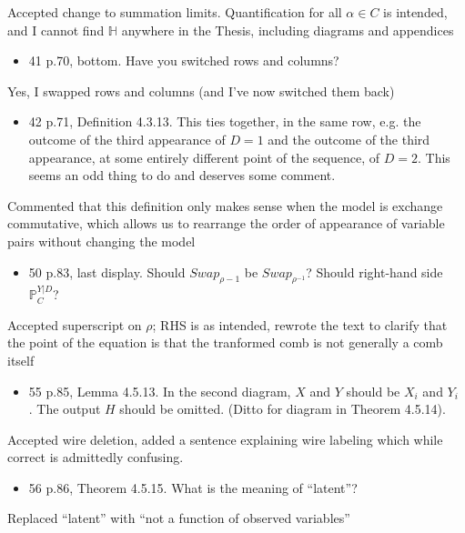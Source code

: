 \documentclass[12pt, a4paper]{article}
\begin{document}
Accepted change to summation limits. Quantification for all $\alpha \in C$ is intended, and I cannot find $\mathbb{H}$ anywhere in the Thesis, including diagrams and appendices

\begin{itemize}
    \item 41 p.70, bottom. Have you switched rows and columns?
\end{itemize}
 

Yes, I swapped rows and columns (and I've now switched them back)

\begin{itemize}
    \item 42 p.71, Definition 4.3.13. This ties together, in the same row, e.g. the outcome of the third appearance of $D = 1$ and the outcome of the third appearance, at some entirely different point of the sequence, of $D = 2$. This seems an odd thing to do and deserves some comment.
\end{itemize}

Commented that this definition only makes sense when the model is exchange commutative, which allows us to rearrange the order of appearance of variable pairs without changing the model


\begin{itemize}
    \item  50 p.83, last display. Should $Swap_{\rho - 1}$ be $Swap_{\rho^{-1}}$? Should right-hand side $\mathbb{P}^{Y|D}_C$?
\end{itemize}


Accepted superscript on $\rho$; RHS is as intended, rewrote the text to clarify that the point of the equation is that the tranformed comb is not generally a comb itself

\begin{itemize}
    \item 55 p.85, Lemma 4.5.13. In the second diagram, $X$ and $Y$ should be $X_i$ and $Y_i$ . The output $H$ should be omitted. (Ditto for diagram in Theorem 4.5.14).
\end{itemize}
 

Accepted wire deletion, added a sentence explaining wire labeling which while correct is admittedly confusing.

\begin{itemize}
    \item 56 p.86, Theorem 4.5.15. What is the meaning of ``latent''?
\end{itemize}
 

Replaced ``latent'' with ``not a function of observed variables''
\end{document}
